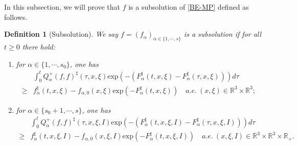 \documentclass[reqno,11pt]{amsart}
\newtheorem{definition}{Definition}[section]
\numberwithin{equation}{section}
\def\R{\mathbb{R}}
\def\exp{\mathrm{exp}}
\begin{document}
In this subsection, we will prove that $f$ is a subsolution of \eqref{BE-MP} defined as follows.
\begin{definition}[Subsolution]\label{SubSolution}
  We say $f = (f_\alpha)_{\alpha \in \{ 1, \cdots, s \}}$ is a subsolution if for all $t \geq 0$ there hold:
  \begin{enumerate}
		\item {for $\alpha \in \{1,\cdots,s_0\}$, one has
	\begin{equation}\label{Subs-1}
		\begin{aligned}
			&\int_{0}^{t}Q^+_{\alpha } (f,f)^\sharp (\tau ,x,\xi ) \exp(-(F^\sharp _{\alpha } (t,x,\xi )-F^\sharp _{\alpha } (\tau,x,\xi ))) d \tau \\
			\geq &f^{\sharp}_\alpha (t,x,\xi) -f_{\alpha ,0} (x,\xi )\exp(-F^\sharp _{\alpha  } (t,x,\xi )) \quad a.e. \ (x,\xi ) \in \R^3 \times \R^3;
		\end{aligned}
	\end{equation}}
	\item {for $\alpha \in \{s_0+1,\cdots,s\}$, one has
	\begin{equation}\label{Subs-2}
		\begin{aligned}
			&\int_{0}^{t}Q^+_{\alpha } (f,f)^\sharp (\tau ,x,\xi ,I) \exp(-(F^\sharp _{\alpha } (t,x,\xi ,I)-F^\sharp _{\alpha } (\tau,x,\xi ,I))) d \tau \\
			\geq &f^{\sharp}_\alpha (t,x,\xi ,I) -f_{\alpha ,0} (x,\xi ,I )\exp(-F^\sharp _{\alpha  } (t,x,\xi ,I)) \quad a.e. \ (x,\xi ,I) \in \R^3 \times \R^3 \times \R_+.
		\end{aligned}
	\end{equation}}
\end{enumerate}
\end{definition}
\end{document}
